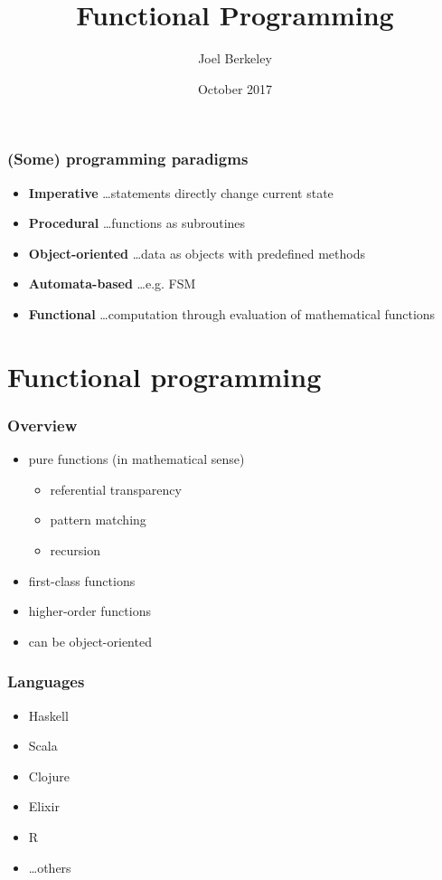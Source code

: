 \documentclass[xcolor={dvipsnames}]{beamer}
\author{Joel Berkeley}
\title{Functional Programming}
\institute{Verimatrix Bristol}
\date{October 2017}
\begin{document}
\begin{frame}
  \maketitle
\end{frame}

\begin{frame}
  \frametitle{(Some) programming paradigms}
  \begin{itemize}
    \item<1-> \textbf{Imperative} \ldots statements directly change current state
    \item<2-> \textbf{Procedural} \ldots functions as subroutines
    \item<3-> \textbf{Object-oriented} \ldots data as objects with predefined methods
    \item<4-> \textbf{Automata-based} \ldots e.g. FSM
    \item<5-> \textbf{Functional} \ldots computation through evaluation of mathematical functions
  \end{itemize}
\end{frame}

\section{Functional programming}

\begin{frame}
  \frametitle{Overview}
  \begin{itemize}
  	\item<1-> pure functions (in mathematical sense)
  	\begin{itemize}
  	  \item<2-> referential transparency
     	\item<2-> pattern matching
      \item<2-> recursion
  	\end{itemize}
  	\item<3-> first-class functions
    \item<4-> higher-order functions
    \item<5-> can be object-oriented
  \end{itemize}
\end{frame}

\begin{frame}
  \frametitle{Languages}
  \begin{itemize}
    \item Haskell
    \item Scala
    \item Clojure
    \item Elixir
    \item R
    \item \ldots others
  \end{itemize}
\end{frame}
\end{document}
